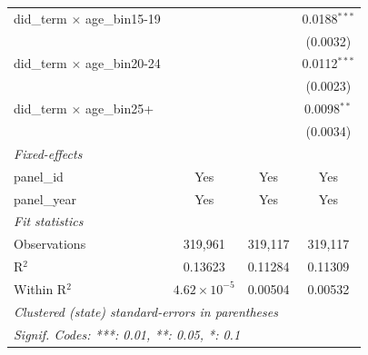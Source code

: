 \begin{tabular}{lccc}
   did\_term $\times$ age\_bin15-19    &                       &                & 0.0188$^{***}$\\   
                                       &                       &                & (0.0032)\\   
   did\_term $\times$ age\_bin20-24    &                       &                & 0.0112$^{***}$\\   
                                       &                       &                & (0.0023)\\   
   did\_term $\times$ age\_bin25+      &                       &                & 0.0098$^{**}$\\   
                                       &                       &                & (0.0034)\\   
   \midrule
   \emph{Fixed-effects}\\
   panel\_id                           & Yes                   & Yes            & Yes\\  
   panel\_year                         & Yes                   & Yes            & Yes\\  
   \midrule
   \emph{Fit statistics}\\
   Observations                        & 319,961               & 319,117        & 319,117\\  
   R$^2$                               & 0.13623               & 0.11284        & 0.11309\\  
   Within R$^2$                        & $4.62\times 10^{-5}$  & 0.00504        & 0.00532\\  
   \midrule \midrule
   \multicolumn{4}{l}{\emph{Clustered (state) standard-errors in parentheses}}\\
   \multicolumn{4}{l}{\emph{Signif. Codes: ***: 0.01, **: 0.05, *: 0.1}}\\
\end{tabular}
\par\endgroup


